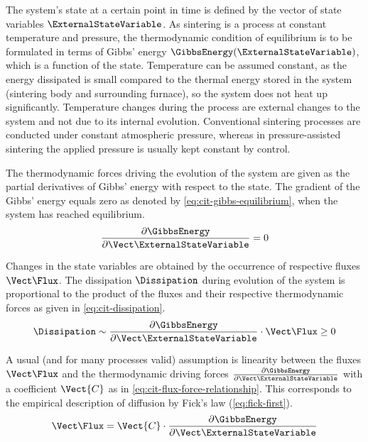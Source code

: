 The system's state at a certain point in time is defined by the vector of state variables $\ExternalStateVariable$.
As sintering is a process at constant temperature and pressure, the thermodynamic condition of equilibrium is to be formulated in terms of Gibbs' energy $\GibbsEnergy(\ExternalStateVariable)$, which is a function of the state.
Temperature can be assumed constant, as the energy dissipated is small compared to the thermal energy stored in the system (sintering body and surrounding furnace), so the system does not heat up significantly.
Temperature changes during the process are external changes to the system and not due to its internal evolution.
Conventional sintering processes are conducted under constant atmospheric pressure, whereas in pressure-assisted sintering the applied pressure is usually kept constant by control.

The thermodynamic forces driving the evolution of the system are given as the partial derivatives of Gibbs' energy with respect to the state.
The gradient of the Gibbs' energy equals zero as denoted by \cref{eq:cit-gibbs-equilibrium}, when the system has reached equilibrium.
\begin{equation}
    \frac{\partial \GibbsEnergy}{\partial \Vect\ExternalStateVariable} = 0
    \label{eq:cit-gibbs-equilibrium}
\end{equation}

Changes in the state variables are obtained by the occurrence of respective fluxes $\Vect\Flux$.
The dissipation $\Dissipation$ during evolution of the system is proportional to the product of the fluxes and their respective thermodynamic forces as given in \cref{eq:cit-dissipation}.
\begin{equation}
    \Dissipation \sim \frac{\partial \GibbsEnergy}{\partial \Vect\ExternalStateVariable} \cdot \Vect\Flux \ge 0
    \label{eq:cit-dissipation}
\end{equation}

A usual (and for many processes valid) assumption is linearity between the fluxes $\Vect\Flux$ and the thermodynamic driving forces $\frac{\partial \GibbsEnergy}{\partial \Vect\ExternalStateVariable}$ with a coefficient $\Vect{C}$ as in \cref{eq:cit-flux-force-relationship}.
This corresponds to the empirical description of diffusion by Fick's law (\cref{eq:fick-first}).
\begin{equation}
    \Vect\Flux = \Vect{C} \cdot \frac{\partial \GibbsEnergy}{\partial \Vect\ExternalStateVariable}
    \label{eq:cit-flux-force-relationship}
\end{equation}

